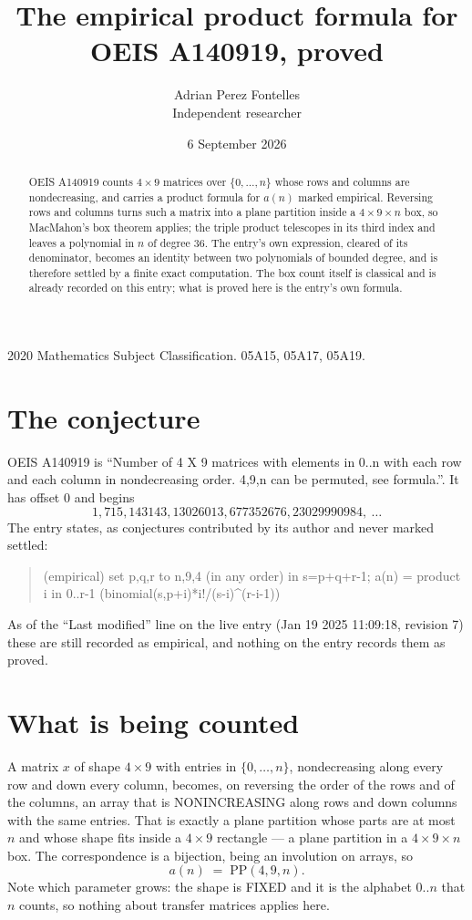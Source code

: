 \documentclass[11pt,a4paper]{article}
\title{The empirical product formula for OEIS A140919, proved}
\author{Adrian Perez Fontelles\\ \small Independent researcher}
\date{6 September 2026}
\theoremstyle{plain}
\theoremstyle{definition}
\begin{document}
\maketitle

\begin{abstract}
OEIS A140919 counts $4\times9$ matrices over $\{0,\dots,n\}$ whose rows and columns are
nondecreasing, and carries a product formula for $a(n)$ marked empirical. Reversing rows and
columns turns such a matrix into a plane partition inside a $4\times9\times n$ box, so
MacMahon's box theorem applies; the triple product telescopes in its third index and leaves a
polynomial in $n$ of degree $36$. The entry's own expression, cleared of its denominator,
becomes an identity between two polynomials of bounded degree, and is therefore settled by a
finite exact computation. The box count itself is classical and is already recorded on this
entry; what is proved here is the entry's own formula.
\end{abstract}

\noindent\small 2020 Mathematics Subject Classification. 05A15, 05A17, 05A19.\normalsize

\section{The conjecture}

OEIS A140919 is ``Number of 4 X 9 matrices with elements in 0..n with each row and each column in nondecreasing order. 4,9,n can be permuted, see formula.''. It has offset $0$ and begins
\[
1, 715, 143143, 13026013, 677352676, 23029990984,\ \dots
\]
The entry states, as conjectures contributed by its author and never marked settled:
\begin{quote}
(empirical) set p,q,r to n,9,4 (in any order) in s=p+q+r-1; a(n) = product {i in 0..r-1} (binomial(s,p+i)*i!/(s-i)\^{}(r-i-1))

\end{quote}
As of the ``Last modified'' line on the live entry (Jan 19 2025 11:09:18, revision 7) these are still
recorded as empirical, and nothing on the entry records them as proved.

\section{What is being counted}

A matrix $x$ of shape $4\times9$ with entries in $\{0,\dots,n\}$, nondecreasing along
every row and down every column, becomes, on reversing the order of the rows and of the
columns, an array that is NONINCREASING along rows and down columns with the same entries. That
is exactly a plane partition whose parts are at most $n$ and whose shape fits inside a
$4\times9$ rectangle --- a plane partition in a $4\times9\times n$ box. The
correspondence is a bijection, being an involution on arrays, so
\[
a(n)\;=\;\mathrm{PP}(4,9,n).
\]
Note which parameter grows: the shape is FIXED and it is the alphabet $0..n$ that $n$ counts,
so nothing about transfer matrices applies here.
\end{document}
